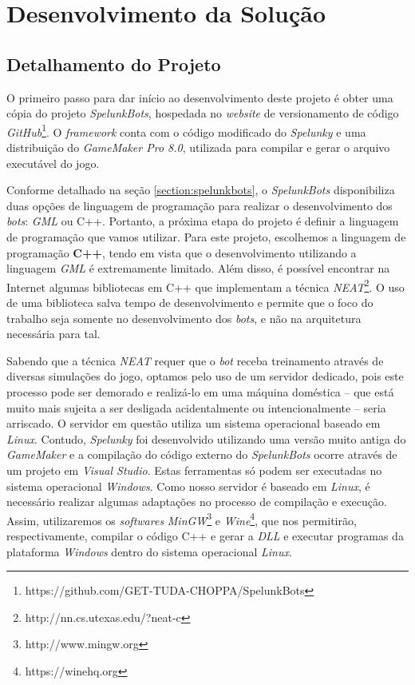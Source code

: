 \chapter{\label{chap:development}Desenvolvimento da Solução}


\section{\label{section:project-details}Detalhamento do Projeto}
O primeiro passo para dar início ao desenvolvimento deste projeto é obter uma
cópia do projeto \textit{SpelunkBots}, hospedada no \textit{website} de
versionamento de código
\textit{GitHub}\footnote{https://github.com/GET-TUDA-CHOPPA/SpelunkBots}. O
\textit{framework} conta com o código modificado do \textit{Spelunky} e uma
distribuição do \textit{GameMaker Pro 8.0}, utilizada para compilar e gerar o
arquivo executável do jogo.

Conforme detalhado na seção \ref{section:spelunkbots}, o \textit{SpelunkBots}
disponibiliza duas opções de linguagem de programação para realizar o
desenvolvimento dos \textit{bots}: \textit{GML} ou C++. Portanto, a próxima
etapa do projeto é definir a linguagem de programação que vamos utilizar. Para
este projeto, escolhemos a linguagem de programação \textbf{C++}, tendo em vista
que o desenvolvimento utilizando a linguagem \textit{GML} é extremamente
limitado. Além disso, é possível encontrar na Internet algumas bibliotecas em
C++ que implementam a técnica
\textit{NEAT}\footnote{http://nn.cs.utexas.edu/?neat-c}. O uso de uma biblioteca
salva tempo de desenvolvimento e permite que o foco do trabalho seja somente no
desenvolvimento dos \textit{bots}, e não na arquitetura necessária para tal.

Sabendo que a técnica \textit{NEAT} requer que o \textit{bot} receba treinamento
através de diversas simulações do jogo, optamos pelo uso de um servidor
dedicado, pois este processo pode ser demorado e realizá-lo em uma máquina
doméstica -- que está muito mais sujeita a ser desligada acidentalmente ou
intencionalmente -- seria arriscado. O servidor em questão utiliza um sistema
operacional baseado em \textit{Linux}.  Contudo, \textit{Spelunky} foi
desenvolvido utilizando uma versão muito antiga do \textit{GameMaker} e a
compilação do código externo do \textit{SpelunkBots} ocorre através de um
projeto em \textit{Visual Studio}.  Estas ferramentas só podem ser executadas no
sistema operacional \textit{Windows}. Como nosso servidor é baseado em
\textit{Linux}, é necessário realizar algumas adaptações no processo de
compilação e execução. Assim, utilizaremos os \textit{softwares}
\textit{MinGW}\footnote{http://www.mingw.org} e
\textit{Wine}\footnote{https://winehq.org}, que nos permitirão, respectivamente,
compilar o código C++ e gerar a \textit{DLL} e executar programas da plataforma
\textit{Windows} dentro do sistema operacional \textit{Linux}.

